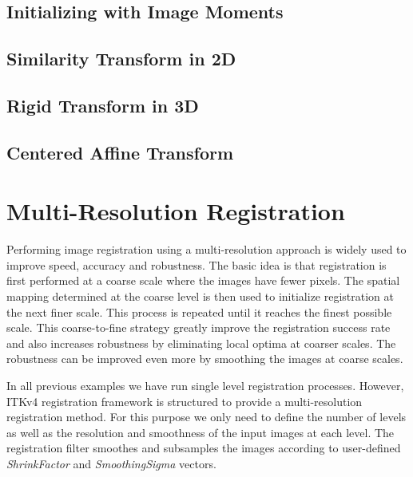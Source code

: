 \subsection{Initializing with Image Moments}
\label{sec:InitializingRegistrationWithMoments}
\ifitkFullVersion

\fi



\subsection{Similarity Transform in 2D}
\label{sec:SimilarityRegistrationIn2D}
\ifitkFullVersion

\fi



\subsection{Rigid Transform in 3D}
\label{sec:RigidRegistrationIn3D}
\ifitkFullVersion

\fi




\subsection{Centered Affine Transform}
\label{sec:CenteredAffineTransform}
\ifitkFullVersion

\fi




\section{Multi-Resolution Registration}
\label{sec:MultiResolutionRegistration}
Performing image registration using a multi-resolution approach is widely used
to improve speed, accuracy and robustness. The basic idea is that registration
is first performed at a coarse scale where the images have fewer pixels.
The spatial mapping determined at the coarse level is then used to initialize
registration at the next finer scale. This process is repeated until it
reaches the finest possible scale. This coarse-to-fine strategy greatly
improve the registration success rate and also increases robustness
by eliminating local optima at coarser scales. The robustness can be improved
even more by smoothing the images at coarse scales.

In all previous examples we have run single level registration processes. However,
ITKv4 registration framework is structured to provide a multi-resolution registration
method. For this purpose we only need to define the number of levels as well as the
resolution and smoothness of the input images at each level. The registration filter
smoothes and subsamples the images according to user-defined \emph{ShrinkFactor} and
\emph{SmoothingSigma} vectors.

